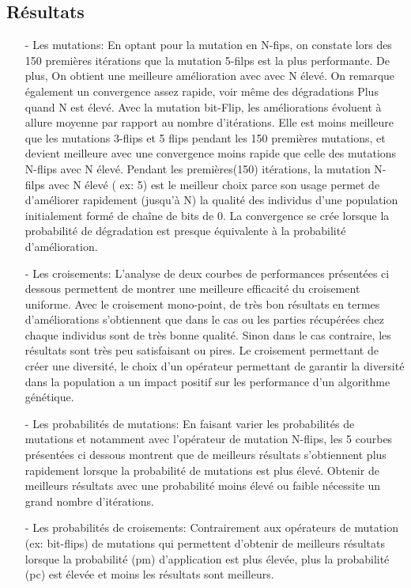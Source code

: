 \documentclass{article}
\begin{document}
\subsection{Résultats}
\begin{itemize}
\item [-] Les mutations: 
En optant pour la mutation en N-fips, on constate lors des 150 premières itérations que la mutation 5-filps est la plus performante. De plus, On obtient une meilleure amélioration avec avec N élevé. On remarque également un convergence assez rapide, voir même des dégradations Plus quand N est élevé.
Avec la  mutation bit-Flip, les améliorations évoluent à allure moyenne par rapport au nombre d'itérations. Elle est moins meilleure que les mutations 3-flips et 5 flips  pendant les 150 premières mutations, et devient meilleure avec une  convergence moins rapide que celle des mutations N-flips avec N élevé.
Pendant les premières(150) itérations, la mutation N-filps avec N élevé ( ex: 5) est le meilleur choix parce son usage permet de d'améliorer rapidement (jusqu'à N) la qualité des individus d'une population initialement formé de chaîne de bits de 0. La convergence se crée lorsque la probabilité de dégradation est presque équivalente à la probabilité d'amélioration.

\item [-] Les croisements:
L'analyse de deux courbes de performances présentées ci dessous permettent de montrer une meilleure efficacité du croisement uniforme. Avec le croisement mono-point, de très bon résultats en termes d'améliorations s'obtiennent que dans le cas ou  les parties récupérées chez chaque individus sont de très bonne qualité. Sinon dans le cas contraire, les résultats sont très peu satisfaisant ou pires. Le croisement permettant de créer une diversité, le choix d'un opérateur permettant de garantir la diversité dans la population a un impact positif sur les performance d'un algorithme génétique.

\item[-] Les probabilités de mutations:
En faisant varier les probabilités de mutations et notamment avec l'opérateur de mutation N-flips, les 5 courbes présentées ci dessous montrent que de meilleurs résultats s'obtiennent plus rapidement lorsque la probabilité de mutations est plus élevé. Obtenir de meilleurs résultats avec une probabilité moins élevé ou faible nécessite un grand nombre d'itérations. 

\item[-] Les probabilités de croisements:
Contrairement aux opérateurs de mutation (ex: bit-flips) de mutations qui permettent d'obtenir de meilleurs résultats lorsque la probabilité (pm) d'application est plus élevée,  plus la probabilité (pc) est élevée  et moins les résultats sont meilleurs. 


\end{itemize}
\end{document}
